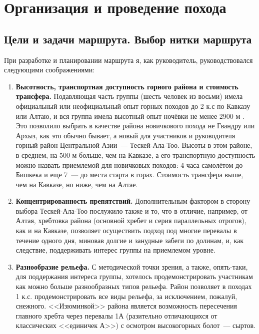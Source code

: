 \section{Организация и проведение похода}
\subsection{Цели и задачи маршрута. Выбор нитки маршрута}
При разработке и планировании маршрута я, как руководитель, руководствовался следующими соображениями:
\begin{enumerate} 
	\item \textbf{Высотность, транспортная доступность горного района и стоимость трансфера.}
	Подавляющая часть группы (шесть человек из восьми) имела официальный или неофициальный опыт горных походов до 2 к.с по Кавказу \cite{Snegovskaya2024} или Алтаю, и вся группа имела высотный опыт ночёвки не менее 2900 м \cite{ostapiv2025}. Это позволило выбрать в качестве района новичкового похода не Гвандру или Архыз, как это обычно бывает, а новый для участников и руководителя горный район Центральной Азии~--- Тескей-Ала-Тоо. Высоты в этом районе, в среднем, на 500 м больше, чем на Кавказе, а его транспортную доступность можно назвать приемлемой для новичковых походов: 4 часа самолётом до Бишкека и еще 7~--- до места старта в горах. Стоимость трансфера выше, чем на Кавказе, но ниже, чем на Алтае. 
		
	\item \textbf{Концентрированность препятствий.}
	Дополнительным фактором в сторону выбора Тескей-Ала-Тоо послужило также и то, что в отличие, например, от Алтая, хребтовка района (основной хребет и серия параллельных отрогов), как и на Кавказе, позволяет осуществить подход под многие перевалы в течение одного дня, миновав долгие и занудные забеги по долинам, и, как следствие, поддерживать интерес группы на приемлемом уровне.
	
	\item \textbf{Разнообразие рельефа.} 
	С методической точки зрения, а также, опять-таки, для поддержания интереса группы, хотелось продемонстрировать участникам как можно больше разнообразных типов рельефа. Район позволяет в походах 1 к.с. продемонстрировать все виды рельефа, за исключением, пожалуй, снежного. <<Изюминкой>> района является возможность пересечения главного хребта через перевалы 1А (разительно отличающихся от классических <<единичек А>>) с осмотром высокогорных болот~--- сыртов.
	

\end{enumerate}
